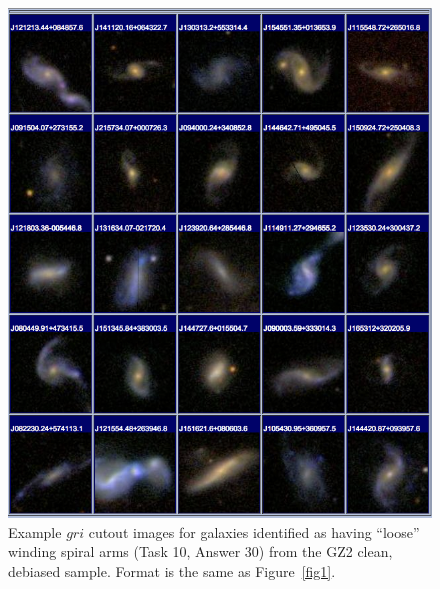 \documentclass[useAMS,usenatbib]{mn2e}
\begin{document}
\newpage
\clearpage
\begin{figure}
\includegraphics[angle=0,width=7.0in]{figures/gallery/loose.png}
\caption{Example $gri$ cutout images for galaxies identified as having ``loose'' winding spiral arms (Task 10, Answer 30) from the GZ2 clean, debiased sample. Format is the same as Figure~\ref{fig1}.}
\end{figure}
\end{document}
